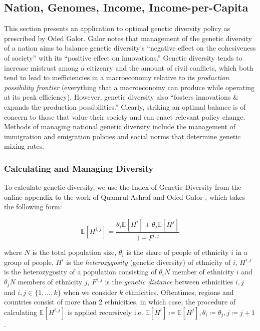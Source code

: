 \documentclass{article}
\begin{document}
\subsection{Nation, Genomes, Income, Income-per-Capita}
This section presents an application to optimal genetic diversity policy as prescribed by Oded Galor. Galor notes that management of the genetic diversity of a nation aims to balance genetic diversity's ``negative effect on the cohesiveness of society'' with its ``positive effect on innovations.'' Genetic diversity tends to increase mistrust among a citizenry and the amount of civil conflicts, which both tend to lead to inefficiencies in a macroeconomy relative to its \textit{production possibility frontier} (everything that a macroeconomy can produce while operating at its peak efficiency). However, genetic diversity also ``fosters innovations & expands the production possibilities.'' Clearly, striking an optimal balance is of concern to those that value their society and can enact relevant policy change. Methods of managing national genetic diversity include the management of immigration and emigration policies and social norms that determine genetic mixing rates. \cite{OdedSlides}

\subsubsection{Calculating and Managing Diversity}
To calculate genetic diversity, we use the Index of Genetic Diversity from the online appendix to the work of Quamrul Ashraf and Oded Galor \cite{geneticDiv}, which takes the following form:

\[
\mathbb{E}[H^{i,j}] = \frac{\theta_i\mathbb{E}[H^i] + \theta_j\mathbb{E}[H^j]}{1-F^{i,j}}
\]

where $N$ is the total population size, $\theta_i$ is the share of people of ethnicity $i$ in a group of people, $H^i$ is the \textit{heterozygosity} (genetic diversity) of ethnicity of $i$, $H^{i,j}$ is the heterozygosity of a population consisting of $\theta_iN$ member of ethnicity $i$ and $\theta_jN$ members of ethnicity $j$, $F^{i,j}$ is the \textit{genetic distance} between ethnicities $i,j$ and $i,j \in \{1, \dots, k\}$ when we consider $k$ ethnicities. Oftentimes, regions and countries consist of more than 2 ethnicities, in which case, the procedure of calculating $\mathbb{E}[H^{i,j}]$ is applied recursively i.e. $\mathbb{E}[H^i] \coloneqq \mathbb{E}[H^j], \theta_i \coloneqq \theta_j, j \coloneqq j+1$.
\end{document}
